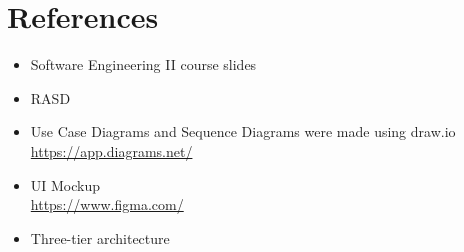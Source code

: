 \chapter{References}
\begin{itemize}
    \item Software Engineering II course slides
    \item RASD
    \item Use Case Diagrams and Sequence Diagrams were made using draw.io\\ \url{https://app.diagrams.net/}
    \item UI Mockup \\ \url{https://www.figma.com/}
    \item Three-tier architecture \\
\end{itemize}